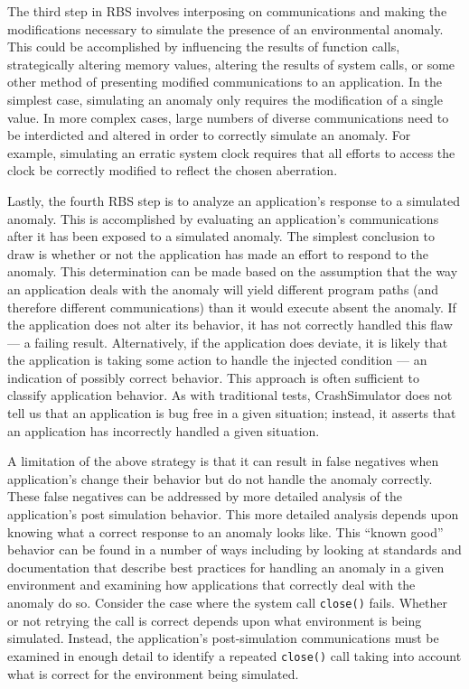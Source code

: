 The third step in RBS
involves interposing on communications
and making the modifications necessary
to simulate the presence
of an environmental anomaly.
This could be accomplished by
influencing the results of function calls,
strategically altering memory values,
altering the results of system calls,
or some other method
of presenting modified communications to an application.
In the simplest case,
simulating an anomaly only requires
the modification of a single value.
In more complex cases,
large numbers of diverse communications
need to be interdicted and altered
in order to correctly simulate an anomaly.
For example,
simulating an erratic system clock
requires that all efforts
to access the clock
be correctly modified
to reflect the chosen aberration.

Lastly, the fourth RBS step
is to analyze an application's response
to a simulated anomaly.
This is accomplished by evaluating an application's
communications after it has been exposed
to a simulated anomaly.
The simplest conclusion to draw
is whether or not the application
has made an effort to respond
to the anomaly.
This determination can be made based
on the assumption that the way an
application deals with the anomaly will yield
different program paths (and therefore different communications) than
it would execute absent the anomaly.
If the application
does not alter its behavior, it has not
correctly handled this flaw --- a failing result.
Alternatively,
if the application does deviate,
it is likely that the application is taking some
action to handle the injected condition --- an indication of possibly
correct behavior.
This approach is often sufficient
to classify application behavior.
As with traditional tests,
CrashSimulator does not tell us that an application
is bug free in a given situation;
instead,
it asserts that an application
has incorrectly handled a given situation.

A limitation of the above strategy
is that it can result in false negatives
when application's change their behavior
but do not handle the anomaly correctly.
These false negatives can be addressed
by more detailed analysis
of the application's post simulation behavior.
This more detailed analysis
depends upon knowing what a correct response
to an anomaly looks like.
This ``known good'' behavior can be found
in a number of ways
including by looking at standards and documentation
that describe best practices for handling an anomaly
in a given environment
and examining how applications that correctly
deal with the anomaly do so.
Consider the case where the system call {\tt close()} fails.
Whether or not retrying the call is correct
depends upon what environment is being simulated.
Instead, the application's post-simulation communications
must be examined in enough detail to identify a repeated {\tt close()}
call taking into account
what is correct for the environment being simulated.


